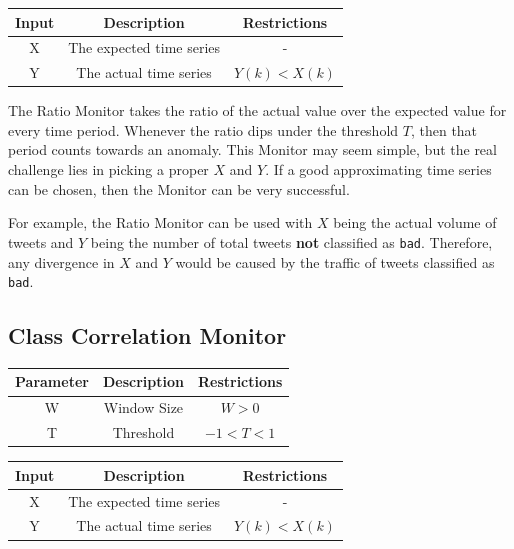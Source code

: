 \documentclass[12pt]{ucthesis}
\begin{document}
\begin{table}[H]
   \begin{center}
      \begin{tabular}{|c|c|c|}
         \hline
            Input & Description & Restrictions \\
         \hline
            X & The expected time series & - \\
         \hline
            Y & The actual time series & $ Y(k) < X(k) $\\
         \hline
      \end{tabular}
   \end{center}
\end{table}

The Ratio Monitor takes the ratio of the actual value over the expected value for every time period.
Whenever the ratio dips under the threshold $T$, then that period counts towards an anomaly.
This Monitor may seem simple, but the real challenge lies in picking a proper $X$ and $Y$.
If a good approximating time series can be chosen, then the Monitor can be very successful.

For example, the Ratio Monitor can be used with $X$ being the actual volume of tweets and $Y$ being the number of total tweets \textbf{not} classified as \texttt{bad}.
Therefore, any divergence in $X$ and $Y$ would be caused by the traffic of tweets classified as \texttt{bad}.

\subsection{Class Correlation Monitor}
\label{outage-detection-monitors-Correlation}
\begin{table}[H]
   \begin{center}
      \begin{tabular}{|c|c|c|}
         \hline
            Parameter & Description & Restrictions \\
         \hline
            W & Window Size & $ W > 0 $\\
         \hline
            T & Threshold & $ -1 < T < 1 $\\
         \hline
      \end{tabular}
   \end{center}
\end{table}

\begin{table}[H]
   \begin{center}
      \begin{tabular}{|c|c|c|}
         \hline
            Input & Description & Restrictions \\
         \hline
            X & The expected time series & - \\
         \hline
            Y & The actual time series & $ Y(k) < X(k) $\\
         \hline
      \end{tabular}
   \end{center}
\end{table}
\end{document}
